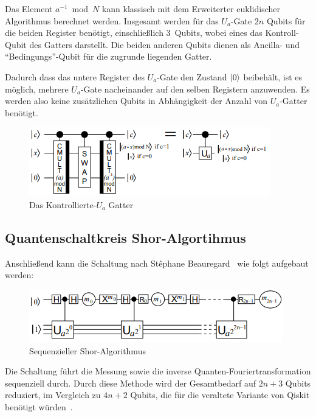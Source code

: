 \documentclass[lettersize,journal]{IEEEtran}
\begin{document}
Das Element \(a^{-1} \bmod N\) kann klassisch
mit dem Erweiterter euklidischer Algorithmus berechnet werden.
Insgesamt werden für das \(U_a\)-Gate \(2n\) Qubits für die beiden Register benötigt,
einschließlich \(3\)~Qubits, wobei eines das Kontroll-Qubit des Gatters darstellt.
Die beiden anderen Qubits dienen als Ancilla- und "`Bedingungs"'-Qubit für die zugrunde liegenden Gatter.

Dadurch dass das untere Register des \(U_a\)-Gate den Zustand \(\ket{0}\) beibehält,
ist es möglich, mehrere \(U_a\)-Gate nacheinander auf den selben Registern anzuwenden.
Es werden also keine zusätzlichen Qubits in Abhängigkeit der Anzahl von \(U_a\)-Gatter benötigt. 

\begin{figure}[h]
\caption{Das Kontrollierte-\(U_a\) Gatter~\cite{beauregard2003circuit}}
\label{fig:c-Ugate}
\includegraphics[width=\linewidth]{c-Ugate2.PNG}
\centering
\end{figure}

\subsection{Quantenschaltkreis Shor-Algortihmus}
Anschließend kann die Schaltung nach
Stêphane Beauregard~\cite{beauregard2003circuit} wie folgt aufgebaut werden:
\begin{figure}[!h]
\caption{Sequenzieller Shor-Algorithmus~\cite{beauregard2003circuit}}
\label{fig:Shor-Algorithmus}
\includegraphics[width=\linewidth]{Shor-Algorithmus.PNG}
\centering
\end{figure}

Die Schaltung führt die Messung sowie die inverse Quanten-Fouriertransformation sequenziell durch.
Durch diese Methode wird der Gesamtbedarf auf \(2n+3\) Qubits reduziert,
im Vergleich zu \(4n+2\) Qubits,
die für die veraltete Variante von Qiskit benötigt würden~\cite{IBM:Shor_docu}.
\end{document}
